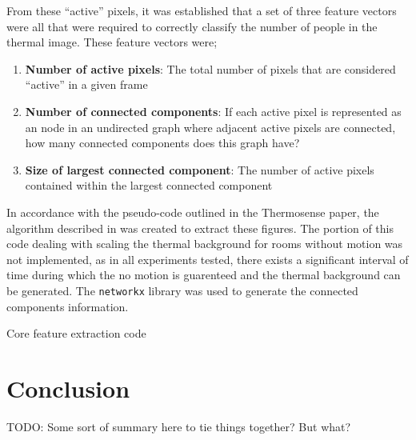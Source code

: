 \documentclass[../thesis/thesis.tex]{subfiles}
\begin{document}
From these ``active'' pixels, it was established that a set of three feature vectors were all that were required to correctly classify the number of people in the thermal image. These feature vectors were;
\begin{enumerate}
\item \textbf{Number of active pixels}: The total number of pixels that are considered ``active'' in a given frame
\item \textbf{Number of connected components}: If each active pixel is represented as an node in an undirected graph where adjacent active pixels are connected, how many connected components does this graph have?
\item \textbf{Size of largest connected component}: The number of active pixels contained within the largest connected component
\end{enumerate}

In accordance with the pseudo-code outlined in the Thermosense paper, the algorithm described in  was created to extract these figures. The portion of this code dealing with scaling the thermal background for rooms without motion was not implemented, as in all experiments tested, there exists a significant interval of time during which the no motion is guarenteed and the thermal background can be generated. The \texttt{networkx} library was used to generate the connected components information.

\begin{listing}
\centering

\caption{Core feature extraction code}
\label{lst:exps:featcode}
\end{listing}


\section{Conclusion}
TODO: Some sort of summary here to tie things together? But what?
 
\end{document}
